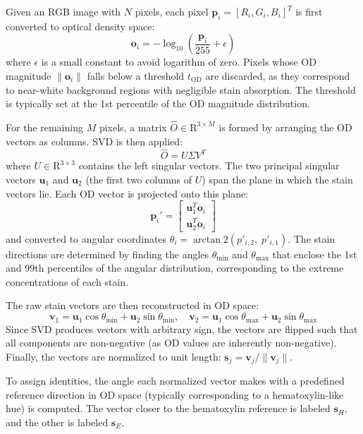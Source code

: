 Given an RGB image with $N$ pixels, each pixel $\mathbf{p}_i = [R_i, G_i, B_i]^T$ is first converted to optical density space:
\begin{equation}
    \mathbf{o}_i = -\log_{10}\left(\frac{\mathbf{p}_i}{255} + \epsilon\right)
\end{equation}
where $\epsilon$ is a small constant to avoid logarithm of zero. Pixels whose OD magnitude $\|\mathbf{o}_i\|$ falls below a threshold $t_{\text{OD}}$ are discarded, as they correspond to near-white background regions with negligible stain absorption. The threshold is typically set at the 1st percentile of the OD magnitude distribution.

For the remaining $M$ pixels, a matrix $\hat{O} \in \mathrm{R}^{3 \times M}$ is formed by arranging the OD vectors as columns. SVD is then applied:
\begin{equation}
    \hat{O} = U \Sigma V^T
\end{equation}
where $U \in \mathrm{R}^{3 \times 3}$ contains the left singular vectors. The two principal singular vectors $\mathbf{u}_1$ and $\mathbf{u}_2$ (the first two columns of $U$) span the plane in which the stain vectors lie. Each OD vector is projected onto this plane:
\begin{equation}
    \mathbf{p}_i' = \begin{bmatrix} \mathbf{u}_1^T \mathbf{o}_i \\ \mathbf{u}_2^T \mathbf{o}_i \end{bmatrix}
\end{equation}
and converted to angular coordinates $\theta_i = \arctan2(p'_{i,2},\; p'_{i,1})$. The stain directions are determined by finding the angles $\theta_{\min}$ and $\theta_{\max}$ that enclose the 1st and 99th percentiles of the angular distribution, corresponding to the extreme concentrations of each stain.

The raw stain vectors are then reconstructed in OD space:
\begin{equation}
    \mathbf{v}_1 = \mathbf{u}_1 \cos\theta_{\min} + \mathbf{u}_2 \sin\theta_{\min}, \quad
    \mathbf{v}_2 = \mathbf{u}_1 \cos\theta_{\max} + \mathbf{u}_2 \sin\theta_{\max}
\end{equation}
Since SVD produces vectors with arbitrary sign, the vectors are flipped such that all components are non-negative (as OD values are inherently non-negative). Finally, the vectors are normalized to unit length: $\mathbf{s}_j = \mathbf{v}_j / \|\mathbf{v}_j\|$.

To assign identities, the angle each normalized vector makes with a predefined reference direction in OD space (typically corresponding to a hematoxylin-like hue) is computed. The vector closer to the hematoxylin reference is labeled $\mathbf{s}_H$, and the other is labeled $\mathbf{s}_E$.


